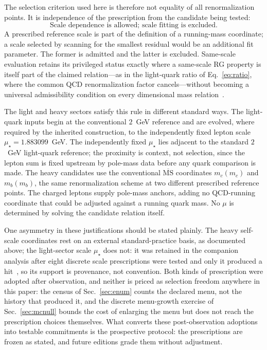 \documentclass[aps,twocolumn,superscriptaddress,nofootinbib,floatfix]{revtex4-2}
\newcommand{\MSbar}{\overline{\mathrm{MS}}}
\newcommand{\mstar}{\mu_\star}
\begin{document}
The selection criterion used here is therefore not equality of all renormalization points. It is independence of the prescription from the candidate being tested:
\begin{equation}
\boxed{\text{Scale dependence is allowed; scale fitting is excluded.}}
\end{equation}
A prescribed reference scale is part of the definition of a running-mass coordinate; a scale selected by scanning for the smallest residual would be an additional fit parameter. The former is admitted and the latter is excluded. Same-scale evaluation retains its privileged status exactly where a same-scale RG property is itself part of the claimed relation---as in the light-quark ratio of Eq.~\eqref{eq:ratio}, where the common QCD renormalization factor cancels---without becoming a universal admissibility condition on every dimensional mass relation~\cite{GasserLeutwyler1982,PDG2026}.

The light and heavy sectors satisfy this rule in different standard ways. The light-quark inputs begin at the conventional $2$~GeV reference and are evolved, where required by the inherited construction, to the independently fixed lepton scale $\mstar=1.883099$~GeV. The independently fixed $\mstar$ lies adjacent to the standard $2$~GeV light-quark reference; the proximity is context, not selection, since the lepton sum is fixed upstream by pole-mass data before any quark comparison is made. The heavy candidates use the conventional $\MSbar$ coordinates $m_c(m_c)$ and $m_b(m_b)$, the same renormalization scheme at two different prescribed reference points. The charged leptons supply pole-mass anchors, adding no QCD-running coordinate that could be adjusted against a running quark mass. No $\mu$ is determined by solving the candidate relation itself.

One asymmetry in these justifications should be stated plainly. The heavy self-scale coordinates rest on an external standard-practice basis, as documented above; the light-sector scale $\mstar$ does not: it was retained in the companion analysis after eight discrete scale prescriptions were tested and only it produced a hit~\cite{BrilliantAPPB}, so its support is provenance, not convention. Both kinds of prescription were adopted after observation, and neither is priced as selection freedom anywhere in this paper: the census of Sec.~\ref{sec:enum} counts the declared menu, not the history that produced it, and the discrete menu-growth exercise of Sec.~\ref{sec:mcnull} bounds the cost of enlarging the menu but does not reach the prescription choices themselves. What converts these post-observation adoptions into testable commitments is the prospective protocol: the prescriptions are frozen as stated, and future editions grade them without adjustment.
\end{document}

